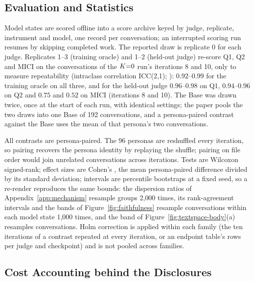 \subsection{Evaluation and Statistics}
\label{app:stats}

Model states are scored offline into a score archive keyed by judge, replicate, instrument and
model, one record per conversation; an interrupted scoring run resumes by skipping completed work.
The reported draw is replicate 0 for each judge. Replicates 1--3 (training oracle) and 1--2
(held-out judge) re-score Q1, Q2 and MICI on the conversations of the $K{=}0$ run's iterations 8 and
10, only to measure repeatability (intraclass correlation ICC(2,1); \citealp{shrout1979icc}):
$0.92$--$0.99$ for the training oracle on all three, and for the held-out judge $0.96$--$0.98$ on
Q1, $0.94$--$0.96$ on Q2 and $0.75$ and $0.52$ on MICI (iterations 8 and 10). The Base was drawn twice, once at the start of
each run, with identical settings; the paper pools the two draws into one Base of 192
conversations, and a persona-paired contrast against the Base uses the mean of that persona's two
conversations.

All contrasts are persona-paired. The 96 personas are reshuffled every iteration, so pairing
recovers the persona identity by replaying the shuffle; pairing on file order would join unrelated
conversations across iterations. Tests
are Wilcoxon signed-rank; effect sizes are Cohen's \dz, the mean persona-paired difference divided
by its standard deviation; intervals are percentile
bootstraps at a fixed seed, so a re-render reproduces the same bounds: the dispersion ratios of
Appendix~\ref{app:mechanism} resample groups 2{,}000 times, its rank-agreement intervals and the
bands of Figure~\ref{fig:faithfulness} resample conversations within each model state 1{,}000
times, and the band of Figure~\ref{fig:textspace-body}(a) resamples conversations. Holm correction is applied
within each family (the ten iterations of a contrast repeated at every iteration, or an endpoint
table's rows per judge and checkpoint) and is not pooled across families.

\subsection{Cost Accounting behind the Disclosures}
\label{app:repro-cost}


